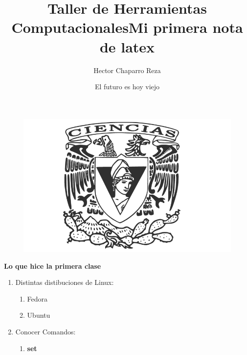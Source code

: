 \documentclass[letterpaper, 12pt, oneside]{article} %
\title{\Huge{Taller de Herramientas Computacionales}}
\author{Hector Chaparro Reza}
\date{El futuro es hoy viejo}
\begin{document}
	\maketitle
	\begin{figure}
		\includegraphics[scale=4]{1.png}
	\end{figure}
	\newpage
	
	\title{\Huge{Mi primera nota de latex}}
	\textbf{Lo que hice la primera clase}
	
	\begin{enumerate}
		\item Distintas distibuciones de Linux:
		\begin{enumerate}
			\item Fedora
			\item Ubuntu
		\end{enumerate}
		\item Conocer Comandos:
		\begin{enumerate}
			\item \color{red}\textbf{set}
		\end{enumerate}
	\end{enumerate}
\end{document}
